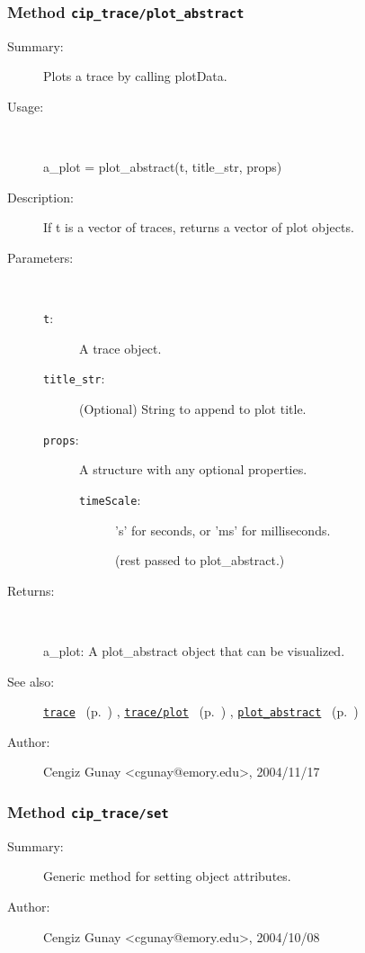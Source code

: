 \subsubsection[Method \texttt{plot\_abstract}]{Method \texttt{cip\_trace/plot\_abstract}}%
%
\label{ref_cip_trace__plot_abstract}%
\hypertarget{ref_cip_trace__plot_abstract}{}%
\begin{description}
\item[Summary:]Plots a trace by calling plotData.
%
\item[Usage:]~%
\begin{lyxcode}%
a\_plot = plot\_abstract(t, title\_str, props)
%
\end{lyxcode}%
%
\item[Description:]%
If t is a vector of traces, returns a vector of plot objects.
\item[Parameters:]~
\begin{description}%
\item[\texttt{t}:]
 A trace object.
\item[\texttt{title\_str}:]
 (Optional) String to append to plot title.
\item[\texttt{props}:]
 A structure with any optional properties.
\begin{description}%
\item[\texttt{timeScale}:]
 's' for seconds, or 'ms' for milliseconds.

(rest passed to plot\_abstract.)
\end{description}%
\end{description}%
%
\item[Returns:
]~

	a\_plot: A plot\_abstract object that can be visualized.
%
%
\item[See also:]%
\hyperlink{ref_trace}{\texttt{trace}}%
\ (p.~\pageref{ref_trace})%
%
, \hyperlink{ref_trace__plot}{\texttt{trace/plot}}%
\ (p.~\pageref{ref_trace__plot})%
%
, \hyperlink{ref_plot_abstract}{\texttt{plot\_abstract}}%
\ (p.~\pageref{ref_plot_abstract})%
%
%
\item[Author:]%
Cengiz Gunay <cgunay@emory.edu>, 2004/11/17
%
\end{description}
\methodline%
\subsubsection[Method \texttt{set}]{Method \texttt{cip\_trace/set}}%
%
\label{ref_cip_trace__set}%
\hypertarget{ref_cip_trace__set}{}%
\begin{description}
\item[Summary:]Generic method for setting object attributes.
%
%
%
%
%
%
%
\item[Author:]%
Cengiz Gunay <cgunay@emory.edu>, 2004/10/08
%
\end{description}
\methodline%
